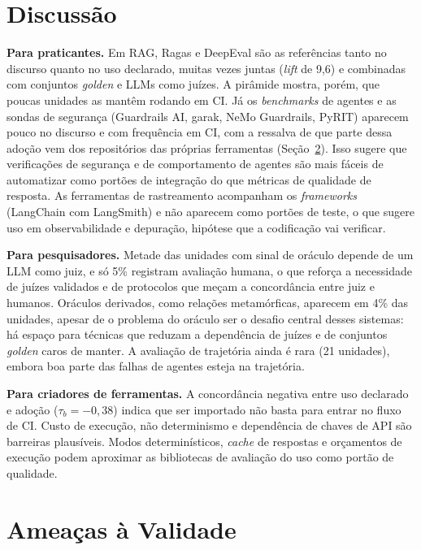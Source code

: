 \documentclass[sigconf]{acmart}
\begin{document}
\section{Discussão}
\label{sec:discussao}

\textbf{Para praticantes.} Em RAG, Ragas e DeepEval são as referências tanto no discurso quanto no uso declarado, muitas vezes juntas (\textit{lift} de 9,6) e combinadas com conjuntos \textit{golden} e LLMs como juízes. A pirâmide mostra, porém, que poucas unidades as mantêm rodando em CI. Já os \textit{benchmarks} de agentes e as sondas de segurança (Guardrails AI, garak, NeMo Guardrails, PyRIT) aparecem pouco no discurso e com frequência em CI, com a ressalva de que parte dessa adoção vem dos repositórios das próprias ferramentas (Seção~\ref{sec:ameacas}). Isso sugere que verificações de segurança e de comportamento de agentes são mais fáceis de automatizar como portões de integração do que métricas de qualidade de resposta. As ferramentas de rastreamento acompanham os \textit{frameworks} (LangChain com LangSmith) e não aparecem como portões de teste, o que sugere uso em observabilidade e depuração, hipótese que a codificação vai verificar.

\textbf{Para pesquisadores.} Metade das unidades com sinal de oráculo depende de um LLM como juiz, e só 5\% registram avaliação humana, o que reforça a necessidade de juízes validados e de protocolos que meçam a concordância entre juiz e humanos. Oráculos derivados, como relações metamórficas, aparecem em 4\% das unidades, apesar de o problema do oráculo ser o desafio central desses sistemas: há espaço para técnicas que reduzam a dependência de juízes e de conjuntos \textit{golden} caros de manter. A avaliação de trajetória ainda é rara (21 unidades), embora boa parte das falhas de agentes esteja na trajetória.

\textbf{Para criadores de ferramentas.} A concordância negativa entre uso declarado e adoção ($\tau_b = -0{,}38$) indica que ser importado não basta para entrar no fluxo de CI. Custo de execução, não determinismo e dependência de chaves de API são barreiras plausíveis. Modos determinísticos, \textit{cache} de respostas e orçamentos de execução podem aproximar as bibliotecas de avaliação do uso como portão de qualidade.

\section{Ameaças à Validade}
\label{sec:ameacas}
\end{document}
